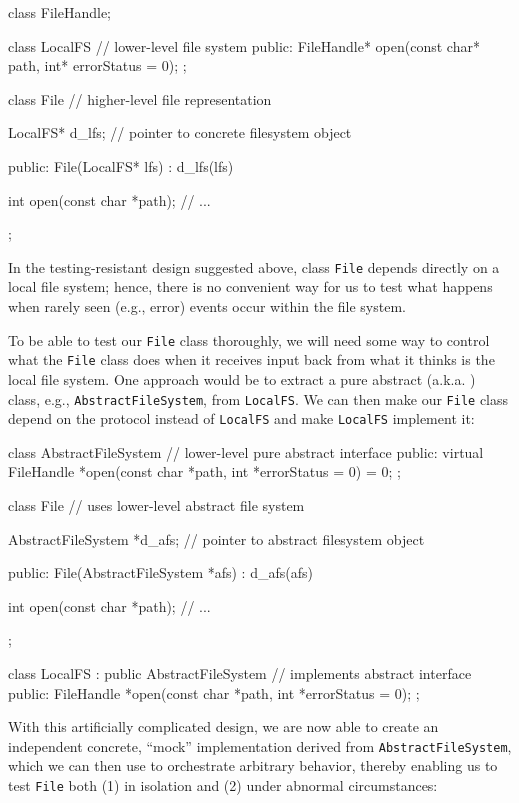 {{\begin{emcppshiddenlisting}[emcppsbatch={e5,e6}]
class FileHandle;
\end{emcppshiddenlisting}
\begin{emcppslisting}[emcppsbatch=e5]
class LocalFS  // lower-level file system
{
public:
    FileHandle* open(const char* path, int* errorStatus = 0);
};

class File  // higher-level file representation
{
    LocalFS* d_lfs;  // pointer to concrete filesystem object

public:
    File(LocalFS* lfs) : d_lfs(lfs) { }

    int open(const char *path);
    // ...
};
\end{emcppslisting}
    

\noindent In the testing-resistant design suggested above, class \lstinline!File!
depends directly on a local file system; hence, there is no convenient
way for us to test what happens when rarely seen (e.g., error) events
occur within the file system.

To be able to test our \lstinline!File! class thoroughly, we will need some
way to control what the \lstinline!File! class does when it receives input
back from what it thinks is the local file system. One approach would be
to extract a pure abstract (a.k.a. ) class, e.g.,
\lstinline!AbstractFileSystem!, from \lstinline!LocalFS!. We can then make our
\lstinline!File! class depend on the protocol instead of \lstinline!LocalFS!
and make \lstinline!LocalFS! implement it:

\begin{emcppslisting}[emcppsbatch=e6]
class AbstractFileSystem  // lower-level pure abstract interface
{
public:
    virtual FileHandle *open(const char *path, int *errorStatus = 0) = 0;
};


class File  // uses lower-level abstract file system
{
    AbstractFileSystem *d_afs;  // pointer to abstract filesystem object

public:
    File(AbstractFileSystem *afs) : d_afs(afs) { }

    int open(const char *path);
    // ...
};

class LocalFS : public AbstractFileSystem  // implements abstract interface
{
public:
    FileHandle *open(const char *path, int *errorStatus = 0);
};
\end{emcppslisting}
    

\noindent With this artificially complicated design, we are now able to create an
independent concrete, ``mock'' implementation derived from
\lstinline!AbstractFileSystem!, which we can then use to orchestrate
arbitrary behavior, thereby enabling us to test \lstinline!File! both (1)
in isolation and (2) under abnormal circumstances:

}}

